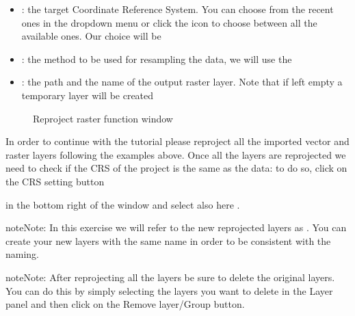\documentclass[letterpaper,10pt,english]{sphinxmanual}
\let\sphinxpxdimen\pdfpxdimen\else\newdimen\sphinxpxdimen
\begin{document}
\begin{enumerate}
\begin{description}
\begin{itemize}
\item {} 
: the target Coordinate Reference System. You can choose from the recent ones in the dropdown menu or click the icon to choose between
all the available ones. Our choice will be 

\item {} 
: the method to be used for resampling the data, we will use the 

\item {} 
:  the path and the name of the output raster layer. Note that if left empty a temporary layer will be created

\end{itemize}

\begin{figure}[htbp]
\centering
\capstart

\noindent{}
\caption{Reproject raster function window}\label{\detokenize{preparation/preparation:id6}}\end{figure}

\end{description}

\end{enumerate}

In order to continue with the tutorial please reproject all the imported vector and raster layers following the examples above.
Once all the layers are reprojected we need to check if the CRS of the project is the same as the data: to do so, click on the
CRS setting button

\noindent{}

in the bottom right of the window and select also here
.

\begin{sphinxadmonition}{note}{Note:}
In this exercise we will refer to the new reprojected layers as .
You can create your new layers with the same name in order to be consistent with the naming.
\end{sphinxadmonition}

\begin{sphinxadmonition}{note}{Note:}
After reprojecting all the layers be sure to delete the original layers. You can do this
by simply selecting the layers you want to delete in the Layer panel and then click on the Remove layer/Group button.

\noindent\sphinxincludegraphics[width=200\sphinxpxdimen]{{2.4.2_remove_layers}.PNG}
\end{sphinxadmonition}
\end{document}
